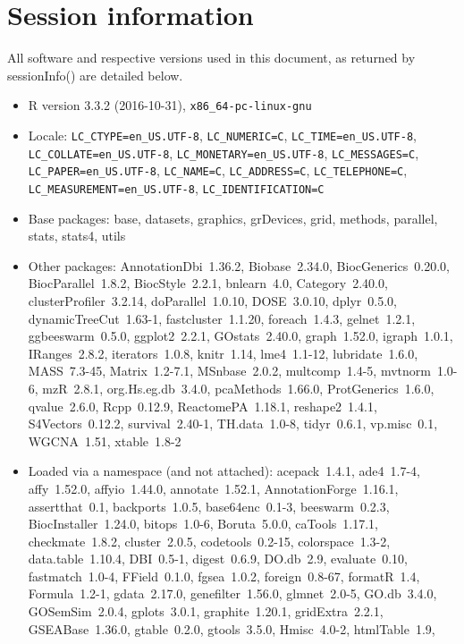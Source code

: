 \documentclass[11pt]{article}\usepackage[]{graphicx}\usepackage[usenames,dvipsnames]{color}
\begin{document}
\clearpage
\section{Session information}
All software and respective versions used in this document, as returned by sessionInfo() are detailed below.
\small
\begin{itemize}\raggedright
  \item R version 3.3.2 (2016-10-31), \verb|x86_64-pc-linux-gnu|
  \item Locale: \verb|LC_CTYPE=en_US.UTF-8|, \verb|LC_NUMERIC=C|, \verb|LC_TIME=en_US.UTF-8|, \verb|LC_COLLATE=en_US.UTF-8|, \verb|LC_MONETARY=en_US.UTF-8|, \verb|LC_MESSAGES=C|, \verb|LC_PAPER=en_US.UTF-8|, \verb|LC_NAME=C|, \verb|LC_ADDRESS=C|, \verb|LC_TELEPHONE=C|, \verb|LC_MEASUREMENT=en_US.UTF-8|, \verb|LC_IDENTIFICATION=C|
  \item Base packages: base, datasets, graphics, grDevices, grid, methods,
    parallel, stats, stats4, utils
  \item Other packages: AnnotationDbi~1.36.2, Biobase~2.34.0,
    BiocGenerics~0.20.0, BiocParallel~1.8.2, BiocStyle~2.2.1, bnlearn~4.0,
    Category~2.40.0, clusterProfiler~3.2.14, doParallel~1.0.10, DOSE~3.0.10,
    dplyr~0.5.0, dynamicTreeCut~1.63-1, fastcluster~1.1.20, foreach~1.4.3,
    gelnet~1.2.1, ggbeeswarm~0.5.0, ggplot2~2.2.1, GOstats~2.40.0, graph~1.52.0,
    igraph~1.0.1, IRanges~2.8.2, iterators~1.0.8, knitr~1.14, lme4~1.1-12,
    lubridate~1.6.0, MASS~7.3-45, Matrix~1.2-7.1, MSnbase~2.0.2, multcomp~1.4-5,
    mvtnorm~1.0-6, mzR~2.8.1, org.Hs.eg.db~3.4.0, pcaMethods~1.66.0,
    ProtGenerics~1.6.0, qvalue~2.6.0, Rcpp~0.12.9, ReactomePA~1.18.1,
    reshape2~1.4.1, S4Vectors~0.12.2, survival~2.40-1, TH.data~1.0-8,
    tidyr~0.6.1, vp.misc~0.1, WGCNA~1.51, xtable~1.8-2
  \item Loaded via a namespace (and not attached): acepack~1.4.1, ade4~1.7-4,
    affy~1.52.0, affyio~1.44.0, annotate~1.52.1, AnnotationForge~1.16.1,
    assertthat~0.1, backports~1.0.5, base64enc~0.1-3, beeswarm~0.2.3,
    BiocInstaller~1.24.0, bitops~1.0-6, Boruta~5.0.0, caTools~1.17.1,
    checkmate~1.8.2, cluster~2.0.5, codetools~0.2-15, colorspace~1.3-2,
    data.table~1.10.4, DBI~0.5-1, digest~0.6.9, DO.db~2.9, evaluate~0.10,
    fastmatch~1.0-4, FField~0.1.0, fgsea~1.0.2, foreign~0.8-67, formatR~1.4,
    Formula~1.2-1, gdata~2.17.0, genefilter~1.56.0, glmnet~2.0-5, GO.db~3.4.0,
    GOSemSim~2.0.4, gplots~3.0.1, graphite~1.20.1, gridExtra~2.2.1,
    GSEABase~1.36.0, gtable~0.2.0, gtools~3.5.0, Hmisc~4.0-2, htmlTable~1.9,

\end{itemize}
\end{document}
